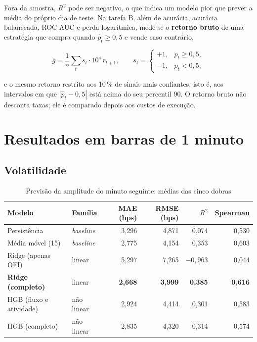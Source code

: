 \noindent Fora da amostra, $R^2$ pode ser negativo, o que indica um modelo pior
que prever a média do próprio dia de teste. Na tarefa B, além de acurácia,
acurácia balanceada, ROC-AUC e perda logarítmica, mede-se o \textbf{retorno
bruto} de uma estratégia que compra quando $\hat{p}_t \geq 0,5$ e vende caso
contrário,

\begin{equation}\label{eq:retornobruto}
  \bar{g} = \frac{1}{n}\sum_{t} s_t \cdot 10^4\, r_{t+1}, \qquad
  s_t = \begin{cases} +1, & \hat{p}_t \geq 0,5,\\ -1, & \hat{p}_t < 0,5, \end{cases}
\end{equation}

\noindent e o mesmo retorno restrito aos 10\,\% de sinais mais confiantes, isto
é, aos intervalos em que $|\hat{p}_t - 0,5|$ está acima do seu percentil 90. O
retorno bruto não desconta taxas; ele é comparado depois aos custos de execução.

\section{Resultados em barras de 1 minuto}\label{sec:resultados1m}

\subsection{Volatilidade}\label{sec:vol1m}

\begin{table}[htbp]
\caption{\label{tab:vol1m}Previsão da amplitude do minuto seguinte: médias das cinco dobras}
\begin{corpotabela}
\begin{tabular}{llrrrr}
\toprule
Modelo & Família & MAE (bps) & RMSE (bps) & $R^2$ & Spearman \\
\midrule
Persistência & \textit{baseline} & 3,296 & 4,871 & 0,074 & 0,530 \\
Média móvel (15) & \textit{baseline} & 2,775 & 4,154 & 0,353 & 0,603 \\
Ridge (apenas OFI) & linear & 5,297 & 7,265 & $-0,963$ & 0,044 \\
\textbf{Ridge (completo)} & linear & \textbf{2,668} & \textbf{3,999} & \textbf{0,385} & \textbf{0,616} \\
HGB (fluxo e atividade) & não linear & 2,924 & 4,414 & 0,301 & 0,583 \\
HGB (completo) & não linear & 2,835 & 4,320 & 0,314 & 0,574 \\
\bottomrule
\end{tabular}
\end{corpotabela}
\end{table}

